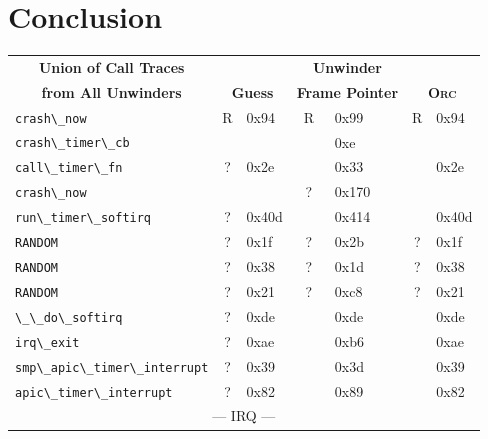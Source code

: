 \documentclass[10pt]{llncs}
\newcommand{\code}[2][]{\lstinline[columns=fullflexible, #1]$#2$}
\newcommand{\orc}{\textsc{Orc}\xspace}
\begin{document}
\section{Conclusion} \label{sec:concl}
\begin{table}[tb!]
  \begin{center}
    \begin{tabular}{|l||c|l|c|l|c|l|} \hline
      \multicolumn{1}{|c||}{\textbf{Union of Call Traces}} &
	\multicolumn{6}{|c|}{\textbf{Unwinder}} \\ \cline{2-7}
      \multicolumn{1}{|c||}{\textbf{from All Unwinders}} &
	\multicolumn{2}{|c|}{\textbf{Guess}} &
	\multicolumn{2}{|c|}{\textbf{Frame Pointer}} &
	\multicolumn{2}{|c|}{\textbf{\orc}} \\ \hline\hline
      \code{crash\_now}		 & R & 0x94  & R & 0x99  & R & 0x94 \\
      \rowcolor[gray]{.9}
      \code{crash\_timer\_cb}	 &   &       &   & 0xe   &  & \\
      \code{call\_timer\_fn}	 & ? & 0x2e  &   & 0x33  &  & 0x2e \\
      \rowcolor[gray]{.9}
      \code{crash\_now}		 &   &       & ? & 0x170 &  & \\
      \code{run\_timer\_softirq} & ? & 0x40d &   & 0x414 &  & 0x40d \\
      \rowcolor[gray]{.9}
      \code{RANDOM}		 & ? & 0x1f  & ? & 0x2b  & ? & 0x1f \\
      \rowcolor[gray]{.9}
      \code{RANDOM}		 & ? & 0x38  & ? & 0x1d  & ? & 0x38 \\
      \rowcolor[gray]{.9}
      \code{RANDOM}		 & ? & 0x21  & ? & 0xc8  & ? & 0x21 \\
      \code{\_\_do\_softirq}	 & ? & 0xde  &   & 0xde  &  & 0xde \\
      \code{irq\_exit}		 & ? & 0xae  &   & 0xb6  &  & 0xae \\
      \code{smp\_apic\_timer\_interrupt} & ? & 0x39 &  & 0x3d &  & 0x39 \\
      \code{apic\_timer\_interrupt} & ? & 0x82 &  & 0x89 &  & 0x82
      \\ \hline\hline

      \multicolumn{7}{|c|}{--- IRQ ---} \\ \hline\hline


\end{tabular}
\end{center}
\end{table}
\end{document}
